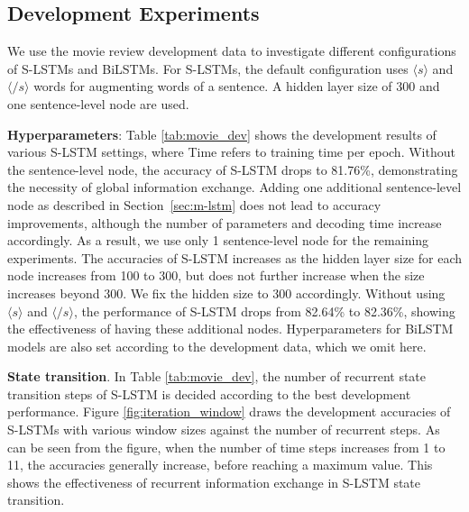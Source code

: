 \documentclass[11pt,a4paper]{article}
\begin{document}
\subsection{Development Experiments}
We use the movie review development data to investigate different configurations of S-LSTMs and BiLSTMs. 
For S-LSTMs, the default configuration uses $\langle s \rangle$ and $\langle /s \rangle$ words for augmenting words of a sentence.
A hidden layer size of 300 and one sentence-level node are used.


\textbf{Hyperparameters}: Table \ref{tab:movie_dev} shows the development results of various S-LSTM settings, where Time refers to training time per epoch.
Without the sentence-level node, the accuracy of S-LSTM drops to 81.76\%, demonstrating the necessity of global information exchange. 
Adding one additional sentence-level node as described in Section~\ref{sec:m-lstm} does not lead to accuracy improvements, although the number of parameters and decoding time increase accordingly. 
As a result, we use only 1 sentence-level node for the remaining experiments.  
The accuracies of S-LSTM increases as the hidden layer size for each node increases from 100 to 300, but does not further increase when the size increases beyond 300. 
We fix the hidden size to 300 accordingly. 
Without using $\langle s \rangle$ and $\langle /s \rangle$, the performance of S-LSTM drops from 82.64\% to 82.36\%, showing the effectiveness of having these additional nodes. 
Hyperparameters for BiLSTM models are also set according to the development data, which we omit here.




{\bf State transition}. In Table \ref{tab:movie_dev}, the number of recurrent state transition steps of S-LSTM is decided according to the best development performance. 
Figure \ref{fig:iteration_window} draws the development accuracies of S-LSTMs with various window sizes against the number of recurrent steps. 
As can be seen from the figure, when the number of time steps increases from 1 to 11, the accuracies generally increase, before reaching a maximum value. 
This shows the effectiveness of recurrent information exchange in S-LSTM state transition.
\end{document}
